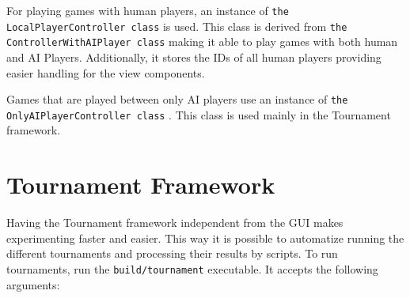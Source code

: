 For playing games with human players, an instance of \texttt{the LocalPlayerController class} is used. This class is derived from 
\texttt{the ControllerWithAIPlayer class} making it able to play games with both human and AI Players. Additionally, it stores the IDs of all
human players providing easier handling for the view components. 

Games that are played between only AI players use an instance of \texttt{the OnlyAIPlayerController class} . This class is used mainly in the Tournament framework.  

\section{Tournament Framework}

Having the Tournament framework independent from the GUI makes experimenting faster and easier. This way it is possible to 
automatize running the different tournaments and processing their results by scripts. To run tournaments, run the 
\texttt{build/tournament} executable. It accepts the following arguments:

